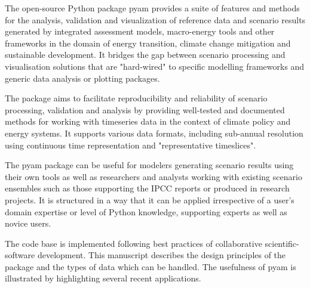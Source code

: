 The open-source Python package pyam provides a suite of features and methods for the analysis, validation and visualization of reference data and scenario results generated by integrated assessment models, macro-energy tools and other frameworks in the domain of energy transition, climate change mitigation and sustainable development.
It bridges the gap between scenario processing and visualisation solutions that are "hard-wired" to specific modelling frameworks and generic data analysis or plotting packages.

The package aims to facilitate reproducibility and reliability of scenario processing, validation and analysis by providing well-tested and documented methods for working with timeseries data in the context of climate policy and energy systems.
It supports various data formats, including sub-annual resolution using continuous time representation and "representative timeslices".

The pyam package can be useful for modelers generating scenario results using their own tools as well as researchers and analysts working with existing scenario ensembles such as those supporting the IPCC reports or produced in research projects.
It is structured in a way that it can be applied irrespective of a user's domain expertise or level of Python knowledge, supporting experts as well as novice users.

The code base is implemented following best practices of collaborative scientific-software development.
This manuscript describes the design principles of the package and the types of data which can be handled.
The usefulness of pyam is illustrated by highlighting several recent applications.
